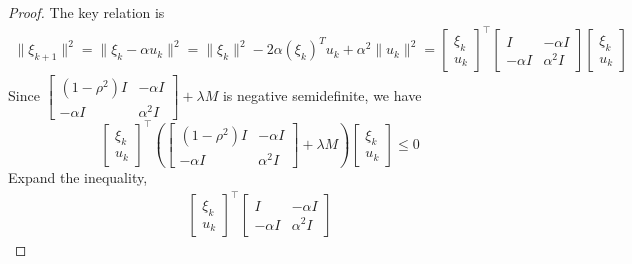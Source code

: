 \documentclass[11pt,a4paper]{article}
\begin{document}
\begin{proof}
The key relation is
\begin{equation}
    \begin{aligned}
        \|\xi_{k+1}\|^2=\|\xi_k-\alpha u_k\|^2=\|\xi_k\|^2-2\alpha (\xi_k)^T u_k+\alpha^2\|u_k\|^2=
        \left[\begin{array}{l}
            \xi_{k} \\
            u_{k}
        \end{array}\right]^{\top} 
        \begin{bmatrix}
            I&	-\alpha I\\
            -\alpha I&	\alpha^2 I
        \end{bmatrix}
        \left[\begin{array}{l}
            \xi_{k} \\
            u_{k}
        \end{array}\right]
    \end{aligned}
    \nonumber
\end{equation}
Since $\left[\begin{array}{cc}
\left(1-\rho^{2}\right) I & -\alpha I \\
-\alpha I & \alpha^{2} I
\end{array}\right]+\lambda M$ is negative semidefinite, we have
$$\left[\begin{array}{l}
    \xi_{k} \\
    u_{k}
\end{array}\right]^{\top}
\left( \left[\begin{array}{cc}
    \left(1-\rho^{2}\right) I & -\alpha I \\
    -\alpha I & \alpha^{2} I
    \end{array}\right]+\lambda M\right)
    \left[\begin{array}{l}
        \xi_{k} \\
        u_{k}
    \end{array}\right]\leq 0$$
Expand the inequality,
\begin{equation}
    \begin{aligned}
        \left[\begin{array}{l}
            \xi_{k} \\
            u_{k}
        \end{array}\right]^{\top}
        \left[\begin{array}{cc}
            I & -\alpha I \\
            -\alpha I & \alpha^{2} I
            \end{array}\right]

\end{aligned}
\end{equation}
\end{proof}
\end{document}
